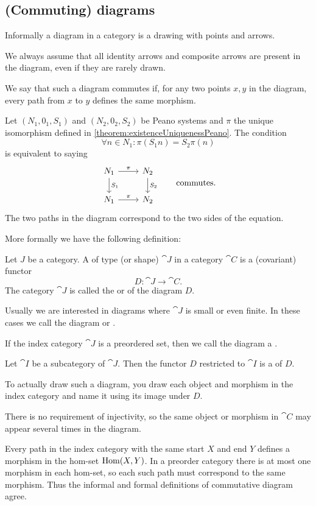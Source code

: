 \subsection{(Commuting) diagrams}
Informally a diagram in a category is a drawing with points and arrows.

We always assume that all identity arrows and composite arrows are present in the diagram, even if they are rarely drawn.

We say that such a diagram commutes if, for any two points $x,y$ in the diagram, every path from $x$ to $y$ defines the same morphism.

\begin{example}
Let $(N_1, 0_1, S_1)$ and $(N_2, 0_2, S_2)$ be Peano systems and $\pi$ the unique isomorphism defined in \ref{theorem:existenceUniquenessPeano}. The condition
\[ \forall n\in N_1: \pi(S_1n) = S_2\pi(n) \]
is equivalent to saying
\[ \begin{tikzcd}
N_1 \ar[r, "\pi"] \ar[d, "S_1"] & N_2 \ar[d, "S_2"] \\
N_1 \ar[r, "\pi"] & N_2
\end{tikzcd} \qquad \text{commutes.} \]
The two paths in the diagram correspond to the two sides of the equation.
\end{example}

More formally we have the following definition:
\begin{definition}
Let $J$ be a category.
A  of type (or shape) $\cat{J}$ in a category $\cat{C}$ is a (covariant) functor
\[ D: \cat{J} \to \cat{C}. \]
The category $\cat{J}$ is called the  or  of the diagram $D$.

Usually we are interested in diagrams where $\cat{J}$ is small or even finite. In these cases we call the diagram  or .

If the index category $\cat{J}$ is a preordered set, then we call the diagram a .

Let $\cat{I}$ be a subcategory of $\cat{J}$. Then the functor $D$ restricted to $\cat{I}$ is a  of $D$.
\end{definition}
To actually draw such a diagram, you draw each object and morphism in the index category and name it using its image under $D$.

There is no requirement of injectivity, so the same object or morphism in $\cat{C}$ may appear several times in the diagram.

Every path in the index category with the same start $X$ and end $Y$ defines a morphism in the hom-set $\operatorname{Hom}(X,Y)$. In a preorder category there is at most one morphism in each hom-set, so each such path must correspond to the same morphism. Thus the informal and formal definitions of commutative diagram agree.

